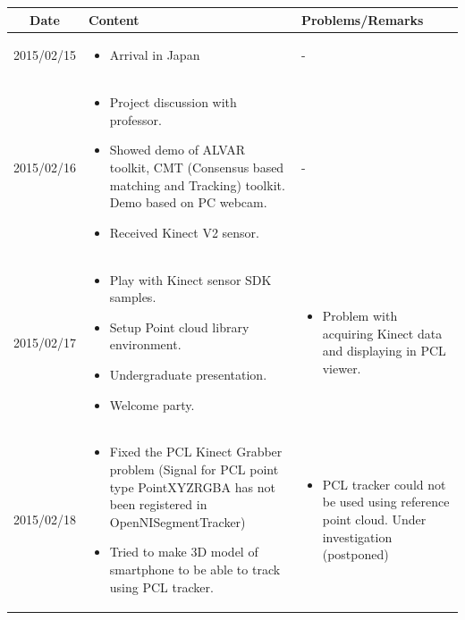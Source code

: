 \documentclass[11pt]{article} %
\begin{document}
\begin{center}
    \begin{longtable}{ | c | p{6cm} | p{5cm} |}
    \hline
    Date & Content & Problems/Remarks \\ 
    \endhead
    \hline

    2015/02/15         
    & 
    
    \begin{itemize}
      \item Arrival in Japan
    \end{itemize}
     &  - \\   		    
    \hline
                                          
    2015/02/16          
    & 
    \begin{itemize} 
    \item Project discussion with professor. 
    \item Showed demo of ALVAR toolkit, CMT (Consensus based matching and Tracking) toolkit. Demo based on PC webcam. 
    \item Received Kinect V2 sensor. 
    \end{itemize} 
  	&  - \\   		    
    \hline
  										 
    2015/02/17          
    & 
    \begin{itemize}
    \item Play with Kinect sensor SDK samples. 
    \item Setup Point cloud library environment. 
    \item Undergraduate presentation. 
    \item Welcome party.
    \end{itemize}   
    & 
    \begin{itemize}
    \item Problem with acquiring Kinect data and displaying in PCL viewer.
    \end{itemize}   \\
    \hline
  										  
    2015/02/18 &
    \begin{itemize}
    \item Fixed the PCL Kinect Grabber problem (Signal for PCL point type PointXYZRGBA has not been registered in OpenNISegmentTracker)
    \item Tried to make 3D model of smartphone to be able to track using PCL tracker.
    \end{itemize}   &
  	\begin{itemize}
    \item PCL tracker could not be used using reference point cloud. Under investigation (postponed)
    \end{itemize}   \\
    \hline
    

\end{longtable}
\end{center}
\end{document}
